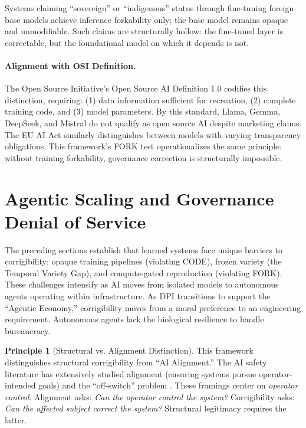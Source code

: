 \documentclass[11pt,a4paper]{article}
\theoremstyle{definition}
\newtheorem{principle}{Principle}[section]
\begin{document}
Systems claiming ``sovereign'' or ``indigenous'' status through fine-tuning foreign base models achieve inference forkability only; the base model remains opaque and unmodifiable. Such claims are structurally hollow: the fine-tuned layer is correctable, but the foundational model on which it depends is not.

\paragraph{Alignment with OSI Definition.} The Open Source Initiative's Open Source AI Definition 1.0 \citep{osi2024} codifies this distinction, requiring: (1) data information sufficient for recreation, (2) complete training code, and (3) model parameters. By this standard, Llama, Gemma, DeepSeek, and Mistral do not qualify as open source AI despite marketing claims. The EU AI Act \citep{euaiact2024} similarly distinguishes between models with varying transparency obligations. This framework's FORK test operationalizes the same principle: without training forkability, governance correction is structurally impossible.


\section{Agentic Scaling and Governance Denial of Service}
\label{sec:agentic}

The preceding sections establish that learned systems face unique barriers to corrigibility: opaque training pipelines (violating CODE), frozen variety (the Temporal Variety Gap), and compute-gated reproduction (violating FORK). These challenges intensify as AI moves from isolated models to autonomous agents operating within infrastructure. As DPI transitions to support the ``Agentic Economy,'' corrigibility moves from a moral preference to an engineering requirement. Autonomous agents lack the biological resilience to handle bureaucracy.

\begin{principle}[Structural vs. Alignment Distinction]
This framework distinguishes structural corrigibility from ``AI Alignment.'' The AI safety literature has extensively studied alignment (ensuring systems pursue operator-intended goals) \citep{soares2017} and the ``off-switch'' problem \citep{hadfield2017}. These framings center on \textit{operator control}. Alignment asks: \textit{Can the operator control the system?} Corrigibility asks: \textit{Can the affected subject correct the system?} Structural legitimacy requires the latter.
\end{principle}
\end{document}
